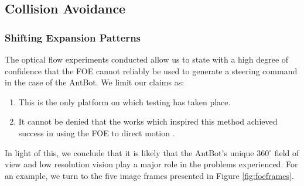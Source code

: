 \documentclass[a4paper,11pt,twoside,openright]{article}
\begin{document}
\subsection{Collision Avoidance}
\subsubsection{Shifting Expansion Patterns}
The optical flow experiments conducted allow us to state with a high
degree of confidence that the FOE cannot reliably be used to generate
a steering command in the case of the AntBot. We limit our claims as:

\begin{enumerate}
\item{This is the only platform on which testing has taken place.}
\item{It cannot be denied that the works which inspired this method
    achieved success in using the FOE to direct motion
    \cite{Stewart2010, Vanderstap2012}.}
\end{enumerate}

In light of this, we conclude that it is likely that the AntBot's unique
360$^\circ$ field of view and low resolution vision play a major role
in the problems experienced. For an example, we turn to the five image
frames presented in Figure \ref{fig:foeframes}.
\newline\par
\end{document}
